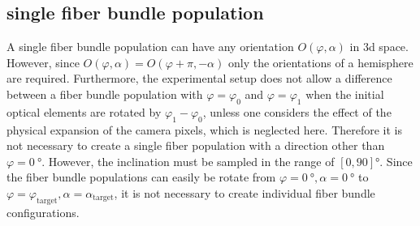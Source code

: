 \subsection{single fiber bundle population}
% 
A single fiber bundle population can have any orientation $O(\varphi,\alpha)$ in 3d space.
However, since $O(\varphi,\alpha) = O(\varphi+\pi,-\alpha)$ only the orientations of a hemisphere are required.
Furthermore, the experimental setup does not allow a difference between a fiber bundle population with $\varphi = \varphi_0$ and $\varphi = \varphi_1$ when the initial optical elements are rotated by $\varphi_1-\varphi_0$, unless one considers the effect of the physical expansion of the camera pixels, which is neglected here.
Therefore it is not necessary to create a single fiber population with a direction other than $\varphi = \SI{0}{\degree}$.
However, the inclination must be sampled in the range of $[0,90]\si{\degree}$.
Since the fiber bundle populations can easily be rotate from $\varphi=\SI{0}{\degree}, \alpha=\SI{0}{\degree}$ to $\varphi=\varphi_{\text{target}}, \alpha=\alpha_{\text{target}}$, it is not necessary to create individual fiber bundle configurations.
\\
%

